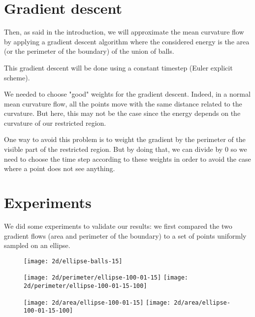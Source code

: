 \section{Gradient descent}

Then, as said in the introduction, we will approximate the mean curvature flow
by applying a gradient descent algorithm where the considered energy is the area
(or the perimeter of the boundary) of the union of balls.

This gradient descent will be done using a constant timestep (Euler explicit
scheme).

We needed to choose "good" weights for the gradient descent. Indeed, in a normal
mean curvature flow, all the points move with the same distance related to the
curvature. But here, this may not be the case since the energy depends on the
curvature of our restricted region.

One way to avoid this problem is to weight the gradient by the perimeter of the
visible part of the restricted region. But by doing that, we can divide by $ 0 $
so we need to choose the time step according to these weights in order to avoid
the case where a point does not see anything.


\section{Experiments}

We did some experiments to validate our results: we first compared the two
gradient flows (area and perimeter of the boundary) to a set of points uniformly
sampled on an ellipse.

\begin{figure}[H]
    \centering

    \texttt{[image: 2d/ellipse-balls-15]}

    \texttt{[image: 2d/perimeter/ellipse-100-01-15]}
    \texttt{[image: 2d/perimeter/ellipse-100-01-15-100]}
    \label{fig:ellipse_perimeter_flow}

    \texttt{[image: 2d/area/ellipse-100-01-15]}
    \texttt{[image: 2d/area/ellipse-100-01-15-100]}
    \label{fig:ellipse_area_flow}
\end{figure}

